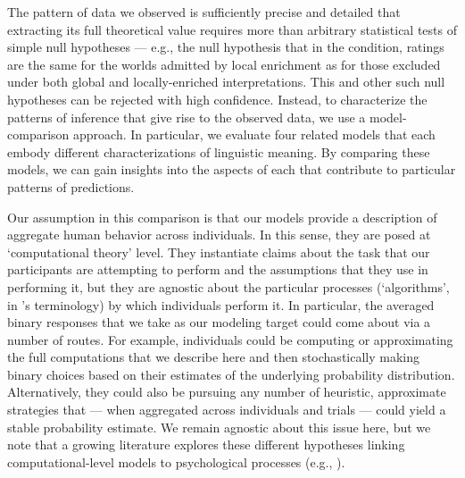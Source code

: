 \documentclass[leqno,12pt]{article}
\begin{document}
The pattern of data we observed is sufficiently precise and detailed
that extracting its full theoretical value requires more than
arbitrary statistical tests of simple null hypotheses --- e.g., the null
hypothesis that in the  condition, ratings
are the same for the worlds admitted by local enrichment as for those
excluded under both global and locally-enriched interpretations.  This
and other such null hypotheses can be rejected with high confidence.
Instead, to characterize the patterns of inference that give rise to
the observed data, we use a model-comparison approach. In particular,
we evaluate four related models that each embody different
characterizations of linguistic meaning. By comparing these models, we
can gain insights into the aspects of each that contribute to
particular patterns of predictions.

Our assumption in this comparison is that our models provide a
description of aggregate human behavior across individuals. In this
sense, they are posed at  `computational theory'
level. They instantiate claims about the task that our participants
are attempting to perform and the assumptions that they use in
performing it, but they are agnostic about the particular processes
(`algorithms', in \citeauthor{marr1982}'s terminology) by which
individuals perform it. In particular, the averaged binary responses
that we take as our modeling target could come about via a number of
routes. For example, individuals could be computing or approximating
the full computations that we describe here and then stochastically
making binary choices based on their estimates of the underlying
probability distribution. Alternatively, they could also be pursuing
any number of heuristic, approximate strategies that --- when
aggregated across individuals and trials --- could yield a stable
probability estimate. We remain agnostic about this issue here, but we
note that a growing literature explores these different hypotheses
linking computational-level models to psychological processes (e.g.,
\citealt{bonawitz2014,griffiths2014,sanborn2010,vul2014}).
\end{document}
